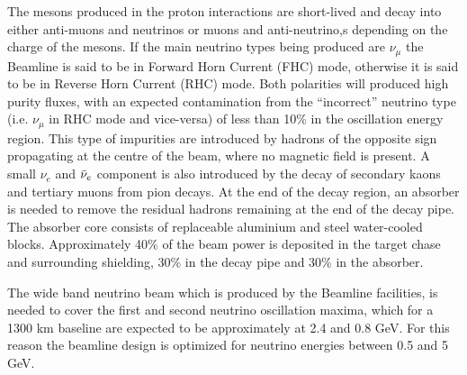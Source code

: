 The mesons produced in the proton interactions are short-lived and decay into either anti-muons and neutrinos or muons and anti-neutrino,s depending on the charge of the mesons. If the main neutrino types being produced are $\nu_\mu$ the Beamline is said to be in Forward Horn Current (FHC) mode, otherwise it is said to be in Reverse Horn Current (RHC) mode.  Both polarities will produced high purity
fluxes, with an expected contamination from the “incorrect” neutrino type (i.e. $\nu_\mu$ in RHC mode and vice-versa) of less than 10\% in the oscillation energy region. This type of impurities are introduced by hadrons of the opposite sign propagating at the centre of the beam, where no magnetic field is present. A small $\nu_e$ and $\Bar{\nu}_e$
component is also introduced by the decay of secondary kaons and tertiary muons from pion decays. At the end of the decay region, an absorber is needed to remove the residual hadrons remaining at the end of the decay pipe.  The absorber core consists of replaceable aluminium and steel water-cooled blocks. Approximately 40\% of the beam power is deposited in the target chase and surrounding shielding, 30\% in the decay pipe and 30\% in the absorber.

The wide band neutrino beam which is produced by the Beamline facilities, is needed to cover the first and second neutrino oscillation maxima, which for a 1300 km baseline are expected to be approximately at 2.4 and 0.8 GeV. For this reason the beamline design is optimized for neutrino energies between 0.5 and 5 GeV. 

